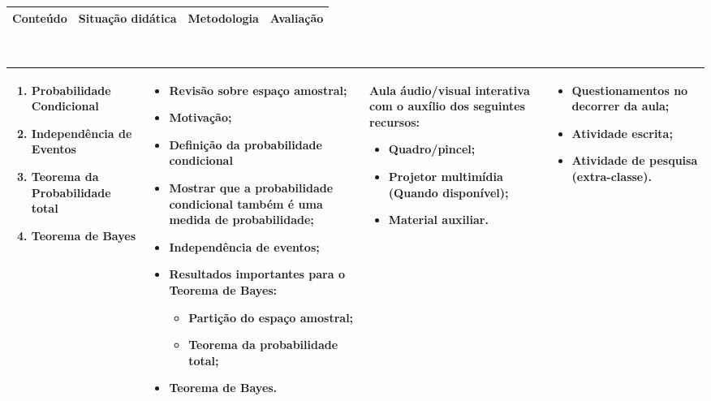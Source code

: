 \documentclass[landscape,a4paper]{article}
\begin{document}
	\begin{center}
		\begin{tabular}{|p{6cm}|p{6cm}|p{6cm}|p{6cm}|}
			\hline
			\large{Conteúdo} \cellcolor{lightgray} & \large{Situação didática} \cellcolor{lightgray} & \large{Metodologia} \cellcolor{lightgray} &
			\large{Avaliação} \cellcolor{lightgray} \\
			\hline
		\end{tabular}\\
		\begin{tabular}{|p{6cm}|p{6cm}|p{6cm}|p{6cm}|}
			\hline
			\begin{enumerate}
				\item Probabilidade Condicional
				\item Independência de Eventos
				\item Teorema da Probabilidade total
				\item Teorema de Bayes
			\end{enumerate} &
			\begin{itemize}
				\item Revisão sobre espaço amostral;
				\item Motivação;
				\item Definição da probabilidade condicional
				\item Mostrar que a probabilidade condicional também é uma medida de probabilidade;
				\item Independência de eventos;
				\item Resultados importantes para o Teorema de Bayes:
				\begin{itemize}
					\item Partição do espaço amostral;
					\item Teorema da probabilidade total;
				\end{itemize}
				\item Teorema de Bayes.
			\end{itemize}&
			Aula áudio/visual interativa com o auxílio dos seguintes recursos:
			\begin{itemize}
				\item Quadro/pincel;
				\item Projetor multimídia (Quando disponível);
				\item Material auxiliar.
			\end{itemize} &
			\begin{itemize}
				\item Questionamentos no decorrer da aula;
				\item Atividade escrita;
				\item Atividade de pesquisa (extra-classe).
			\end{itemize}\\
			\hline
		\end{tabular} \\[.4in]
	\end{center}
\end{document}

